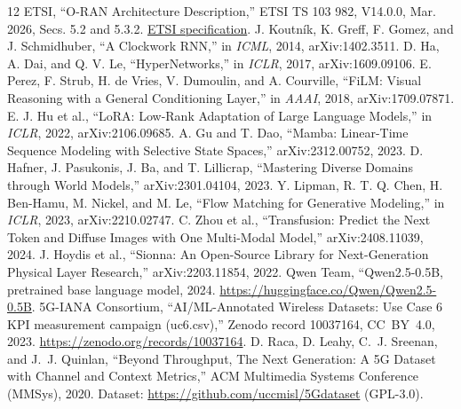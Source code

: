 \documentclass[10pt,twocolumn]{article}
\begin{document}
\begin{thebibliography}{12}
 ETSI, ``O-RAN Architecture Description,'' ETSI TS 103 982,
V14.0.0, Mar. 2026, Secs. 5.2 and 5.3.2.
\href{https://www.etsi.org/deliver/etsi_ts/103900_103999/103982/14.00.00_60/ts_103982v140000p.pdf}{ETSI specification}.
 J. Koutn\'ik, K. Greff, F. Gomez, and J. Schmidhuber,
``A Clockwork RNN,'' in \emph{ICML}, 2014, arXiv:1402.3511.
 D. Ha, A. Dai, and Q. V. Le, ``HyperNetworks,''
in \emph{ICLR}, 2017, arXiv:1609.09106.
 E. Perez, F. Strub, H. de Vries, V. Dumoulin, and A. Courville,
``FiLM: Visual Reasoning with a General Conditioning Layer,''
in \emph{AAAI}, 2018, arXiv:1709.07871.
 E. J. Hu et al., ``LoRA: Low-Rank Adaptation of Large Language
Models,'' in \emph{ICLR}, 2022, arXiv:2106.09685.
 A. Gu and T. Dao, ``Mamba: Linear-Time Sequence Modeling with
Selective State Spaces,'' arXiv:2312.00752, 2023.
 D. Hafner, J. Pasukonis, J. Ba, and T. Lillicrap,
``Mastering Diverse Domains through World Models,'' arXiv:2301.04104, 2023.
 Y. Lipman, R. T. Q. Chen, H. Ben-Hamu, M. Nickel, and M. Le,
``Flow Matching for Generative Modeling,'' in \emph{ICLR}, 2023,
arXiv:2210.02747.
 C. Zhou et al., ``Transfusion: Predict the Next Token and Diffuse
Images with One Multi-Modal Model,'' arXiv:2408.11039, 2024.
 J. Hoydis et al., ``Sionna: An Open-Source Library for
Next-Generation Physical Layer Research,'' arXiv:2203.11854, 2022.
 Qwen Team, ``Qwen2.5-0.5B, pretrained base language model,
2024. \url{https://huggingface.co/Qwen/Qwen2.5-0.5B}.
 5G-IANA Consortium, ``AI/ML-Annotated Wireless Datasets:
Use Case 6 KPI measurement campaign (uc6.csv),'' Zenodo record 10037164,
CC~BY~4.0, 2023. \url{https://zenodo.org/records/10037164}.
 D. Raca, D. Leahy, C.~J. Sreenan, and J.~J. Quinlan,
``Beyond Throughput, The Next Generation: A 5G Dataset with Channel and
Context Metrics,'' ACM Multimedia Systems Conference (MMSys), 2020.
Dataset: \url{https://github.com/uccmisl/5Gdataset} (GPL-3.0).
\end{thebibliography}
\end{document}

